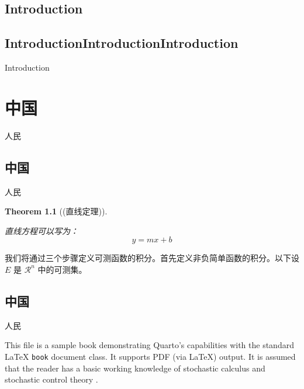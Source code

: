 \documentclass[
  11pt,
  letterpaper,
  onesidefontset=none,
]{ctexbook}
\theoremstyle{plain}
\newtheorem{theorem}{Theorem}[chapter]
\theoremstyle{remark}
\begin{document}
\section*{Introduction}\label{introduction-1}


\section*{IntroductionIntroductionIntroduction}\label{introductionintroductionintroduction}


Introduction


\chapter{中国}\label{ux4e2dux56fd}

人民

\section{中国}\label{ux4e2dux56fd-1}

人民

\begin{theorem}[(直线定理)]\protect\hypertarget{thm-line}{}\label{thm-line}

直线方程可以写为： \[ y = mx + b \]

\end{theorem}

我们将通过三个步骤定义可测函数的积分。首先定义非负简单函数的积分。以下设
\(E\) 是 \(\mathcal{R}^n\) 中的可测集。

\section{中国}\label{ux4e2dux56fd-2}

人民

This file is a sample book demonstrating Quarto's capabilities with the
standard LaTeX \texttt{book} document class. It supports PDF (via LaTeX)
output. It is assumed that the reader has a basic working knowledge of
stochastic calculus \citet{karatzas1991brownian} and stochastic control
theory \citet{yong1999sch}.
\end{document}

